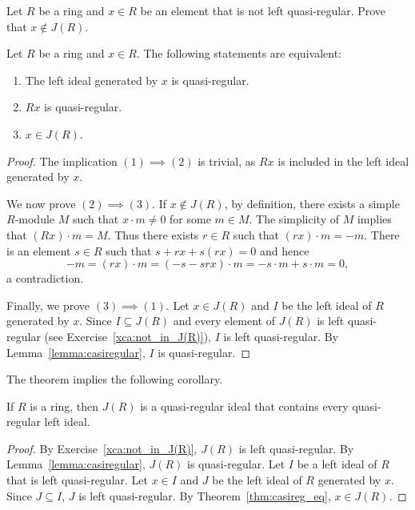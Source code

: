 \begin{exercise}
\label{xca:not_in_J(R)}
Let $R$ be a ring and 
$x\in R$ be an element that is not left quasi-regular. Prove that $x\not\in J(R)$. 
\end{exercise}

\begin{theorem}
	\label{thm:casireg_eq}
	Let $R$ be a ring and $x\in R$. The following statements are equivalent: 
	\begin{enumerate}
		\item The left ideal generated by $x$ is quasi-regular.
		\item $Rx$ is quasi-regular.
		\item $x\in J(R)$.
	\end{enumerate}
\end{theorem}

\begin{proof}
	The implication $(1)\implies(2)$ is trivial, as $Rx$ is included in the left ideal 
	generated by $x$.  
	
	We now prove $(2)\implies(3)$. If
	$x\not\in J(R)$, by definition, there exists a simple 
	$R$-module $M$ such that $x\cdot m\ne 0$ for some $m\in M$. The simplicity of $M$ implies
	that $(Rx)\cdot m=M$. Thus there exists $r\in R$ such that $(rx)\cdot m=-m$. There is an element 
	$s\in R$ such that $s+rx+s(rx)=0$ and hence 
	\[
	-m=(rx)\cdot m=(-s-srx)\cdot m=-s\cdot m+s\cdot m=0,
	\]
	a contradiction. 
	
	Finally, we prove $(3)\implies(1)$. Let $x\in J(R)$ and $I$ be the left ideal of $R$ 
 generated by $x$. Since $I\subseteq J(R)$ and every element of $J(R)$ is left quasi-regular (see Exercise~\ref{xca:not_in_J(R)}), 
 $I$ is left quasi-regular. By Lemma~\ref{lemma:casiregular}, $I$ is quasi-regular. 
\end{proof}

The theorem implies the following corollary. 

\begin{corollary}
	If $R$ is a ring, then $J(R)$ is a quasi-regular ideal that contains every 
	quasi-regular left ideal. 
\end{corollary}

\begin{proof}
    By Exercise~\ref{xca:not_in_J(R)}, $J(R)$ is left quasi-regular. By Lemma~\ref{lemma:casiregular}, $J(R)$ is quasi-regular. 
    Let $I$ be a left ideal of $R$ that is left quasi-regular. Let $x\in I$ and $J$ be the left
    ideal of $R$ generated by $x$. Since $J\subseteq I$, $J$ is left quasi-regular. By Theorem~\ref{thm:casireg_eq}, $x\in J(R)$. 
\end{proof}

